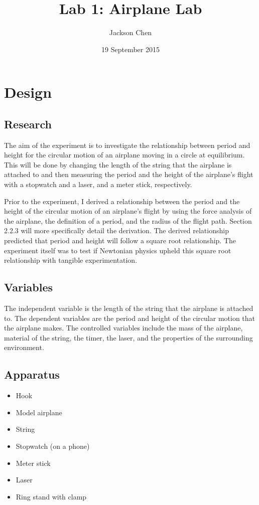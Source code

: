 \documentclass[10pt, letterpaper]{article}
\newcommand{\subtitle}[1]{%
  \posttitle{%
    \par\end{center}
    \begin{center}\large#1\end{center}
    \vskip0.5em}%
}
\begin{document}
\title{Lab 1: Airplane Lab}
\subtitle {IB Physics II Period 6, Petach}
\date{19 September 2015}
\author{Jackson Chen}
\maketitle

\section{Design}

\subsection{Research}

The aim of the experiment is to investigate the relationship between period and height for the circular motion of an airplane
moving in a circle at equilibrium. This will be done by changing the length of the string that the airplane is attached to and then measuring
the period and the height of the airplane's flight with a stopwatch and a laser, and a meter stick, respectively.

Prior to the experiment, I derived a relationship between the period and the height of the circular motion of an airplane's flight
by using the force analysis of the airplane, the definition of a period, and the radius of the flight path. Section 2.2.3 will more
specifically detail the derivation. The derived relationship predicted that period and height will follow a square root relationship.
The experiment itself was to test if Newtonian physics upheld this square root relationship with tangible experimentation.

\subsection{Variables}
The independent variable is the length of the string that the airplane is attached to. The dependent variables are the
period and height of the circular motion that the airplane makes. The controlled variables include the mass of the airplane,
material of the string, the timer, the laser, and the properties of the surrounding environment.

\subsection{Apparatus}
\begin{itemize}
  \item Hook
  \item Model airplane
  \item String
  \item Stopwatch (on a phone)
  \item Meter stick
  \item Laser
  \item Ring stand with clamp
\end{itemize}
\end{document}
